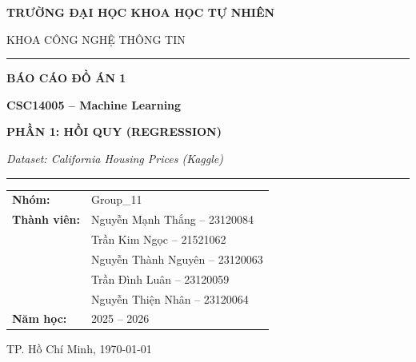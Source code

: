 \documentclass[12pt, a4paper]{article}
\begin{document}
\begin{titlepage}
  \centering
  \vspace*{1.5cm}
  {\Large \textbf{TRƯỜNG ĐẠI HỌC KHOA HỌC TỰ NHIÊN}\par}
  {\large KHOA CÔNG NGHỆ THÔNG TIN\par}
  \vspace{1cm}
  \rule{\linewidth}{0.5pt}
  \vspace{0.8cm}

  {\LARGE \textbf{BÁO CÁO ĐỒ ÁN 1}\par}
  \vspace{0.4cm}
  {\Large \textbf{CSC14005 -- Machine Learning}\par}
  \vspace{0.4cm}
  {\large \textbf{PHẦN 1: HỒI QUY (REGRESSION)}\par}
  \vspace{0.4cm}
  {\large \textit{Dataset: California Housing Prices (Kaggle)}\par}

  \rule{\linewidth}{0.5pt}
  \vspace{1.5cm}

  \begin{tabular}{ll}
    \textbf{Nhóm:}       & Group\_11 \\[4pt]
    \textbf{Thành viên:} & Nguyễn Mạnh Thắng -- 23120084 \\
                         & Trần Kim Ngọc -- 21521062 \\
                         & Nguyễn Thành Nguyên -- 23120063 \\
                         & Trần Đình Luân -- 23120059 \\
                         & Nguyễn Thiện Nhân -- 23120064 \\
    \textbf{Năm học:}    & 2025 -- 2026 \\
  \end{tabular}

  \vfill
  {\large TP. Hồ Chí Minh, \today\par}
\end{titlepage}

\tableofcontents
\newpage

\end{document}
